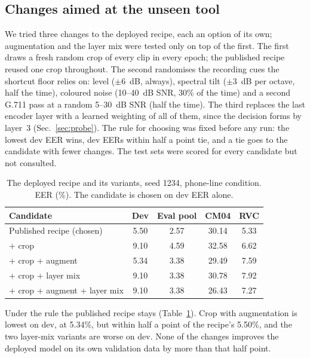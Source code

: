 \subsection{Changes aimed at the unseen tool}
\label{sec:variants}

We tried three changes to the deployed recipe, each an option of its own; augmentation
and the layer mix were tested only on top of the first. The first draws a fresh random
crop of every clip in every epoch; the published recipe reused one crop throughout. The
second randomises the recording cues the shortcut floor relies on: level ($\pm$6~dB,
always), spectral tilt ($\pm$3~dB per octave, half the time), coloured noise (10--40~dB
SNR, 30\% of the time) and a second G.711 pass at a random 5--30~dB SNR (half the time). The third replaces the last encoder layer
with a learned weighting of all of them, since the decision forms by layer~3
(Sec.~\ref{sec:probe}). The rule for choosing was fixed before any run: the lowest
dev EER wins, dev EERs within half a point tie, and a tie goes to the candidate with
fewer changes. The test sets were scored for every candidate but not consulted.

\begin{table}[t]
\centering
\caption{The deployed recipe and its variants, seed 1234, phone-line condition. EER
(\%). The candidate is chosen on dev EER alone.}
\label{tab:variants}
\small
\begin{tabular}{@{}lcccc@{}}
\toprule
Candidate & Dev & Eval pool & CM04 & RVC \\
\midrule
Published recipe (chosen)     & 5.50 & 2.57 & 30.14 & 5.33 \\
+ crop                        & 9.10 & 4.59 & 32.58 & 6.62 \\
+ crop + augment              & 5.34 & 3.38 & 29.49 & 7.59 \\
+ crop + layer mix            & 9.10 & 3.38 & 30.78 & 7.92 \\
+ crop + augment + layer mix  & 9.10 & 3.38 & 26.43 & 7.27 \\
\bottomrule
\end{tabular}
\end{table}

Under the rule the published recipe stays (Table~\ref{tab:variants}). Crop with
augmentation is lowest on dev, at 5.34\%, but within half a point of the recipe's
5.50\%, and the two layer-mix variants are worse on dev. None of the changes improves
the deployed model on its own validation data by more than that half point.

